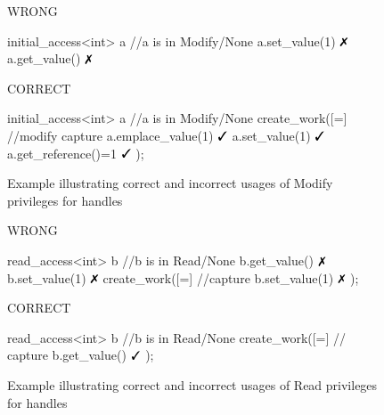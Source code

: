 \begin{figure}
\hspace{-0.75cm}
\begin{minipage}[t]{0.45\linewidth}%
\centering
WRONG
\begin{vaspPseudo}
initial_access<int> a
//a is in Modify/None
a.set_value(1) $\no$ 
a.get_value()  $\no$
\end{vaspPseudo}
\end{minipage}
\hspace{0.55cm}
\begin{minipage}[t]{0.45\linewidth}
\centering
CORRECT
\begin{vaspPseudo}
initial_access<int> a
//a is in Modify/None
create_work([=]{ //modify capture
    a.emplace_value(1)  $\yes$
    a.set_value(1)      $\yes$
    a.get_reference()=1 $\yes$
});
\end{vaspPseudo}
\end{minipage}
\caption{Example illustrating correct and incorrect usages of Modify privileges for handles}
\label{fig:example1vasp}
\end{figure}



\begin{figure} 
\hspace{-0.75cm}
\begin{minipage}[t]{0.45\linewidth}%
\centering
WRONG
\begin{vaspPseudo}
read_access<int> b
//b is in Read/None
b.get_value()   $\no$
b.set_value(1)  $\no$
create_work([=]{ //capture
  b.set_value(1) $\no$
});
\end{vaspPseudo}
\end{minipage}
\hspace{0.55cm}
\begin{minipage}[t]{0.45\linewidth}
\centering
CORRECT
\begin{vaspPseudo}
read_access<int> b
//b is in Read/None
create_work([=]{ // capture
  b.get_value()  $\yes$
});
\end{vaspPseudo}
\end{minipage}
\caption{Example illustrating correct and incorrect usages of Read privileges for handles}
\label{fig:example2vasp}
\end{figure}









